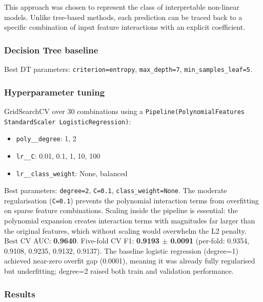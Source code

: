 \documentclass[12pt,a4paper]{article}
\begin{document}
This approach was chosen to represent the class of interpretable non-linear models. Unlike tree-based methods, each prediction can be traced back to a specific combination of input feature interactions with an explicit coefficient.

\subsubsection{Decision Tree baseline}

Best DT parameters: \texttt{criterion=entropy}, \texttt{max\_depth=7}, \texttt{min\_samples\_leaf=5}.

\subsubsection{Hyperparameter tuning}

GridSearchCV over 30 combinations using a \texttt{Pipeline(PolynomialFeatures \textrightarrow{} StandardScaler \textrightarrow{} LogisticRegression)}:
\begin{itemize}[leftmargin=*, noitemsep]
  \item \texttt{poly\_\_degree}: 1, 2
  \item \texttt{lr\_\_C}: 0.01, 0.1, 1, 10, 100
  \item \texttt{lr\_\_class\_weight}: None, balanced
\end{itemize}

Best parameters: \texttt{degree=2}, \texttt{C=0.1}, \texttt{class\_weight=None}. The moderate regularisation (\texttt{C=0.1}) prevents the polynomial interaction terms from overfitting on sparse feature combinations. Scaling inside the pipeline is essential: the polynomial expansion creates interaction terms with magnitudes far larger than the original features, which without scaling would overwhelm the L2 penalty. Best CV AUC: \textbf{0.9640}. Five-fold CV F1: \textbf{0.9193 $\pm$ 0.0091} (per-fold: 0.9354, 0.9108, 0.9235, 0.9132, 0.9137). The baseline logistic regression (degree=1) achieved near-zero overfit gap (0.0001), meaning it was already fully regularised but underfitting; degree=2 raised both train and validation performance.

\subsubsection{Results}
\end{document}
